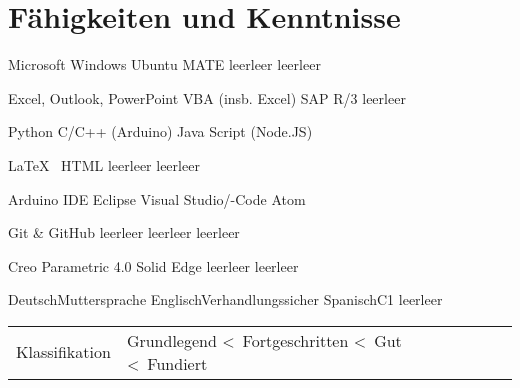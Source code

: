 \section*{Fähigkeiten und Kenntnisse}


%
	{Microsoft Windows}{\fundiert}%
	{Ubuntu MATE}{\fortgeschritten}%
	{leer}{leer}%
	{leer}{leer}%
	

%
	{Excel, Outlook, PowerPoint}{\fundiert}%
	{VBA (insb. Excel)}{\fundiert}%
	{SAP R/3}{\fortgeschritten}%
	{leer}{leer}%
	

	{Python}{\gut}
	{C/C++ (Arduino)}{\gut}
	{Java Script (Node.JS)}{\gut}
	{}{\fortgeschritten}
	

%
	{\LaTeX\ }{\gut}%
	{HTML}{\grundlegend}%
	{leer}{leer}%
	{leer}{leer}%


%
	{Arduino IDE}{\gut}%
	{Eclipse}{\fortgeschritten}%
	{Visual Studio/-Code}{\grundlegend}%
	{Atom}{\grundlegend}%
	

%
	{Git \& GitHub}{\grundlegend}%
	{leer}{leer}%
	{leer}{leer}%
	{leer}{leer}%


%
	{Creo Parametric 4.0}{\fundiert}%
	{Solid Edge}{\gut}%
	{leer}{leer}%
	{leer}{leer}%
	

%
	{Deutsch}{Muttersprache}%
	{Englisch}{Verhandlungssicher}%
	{Spanisch}{C1}%
	{leer}{leer}%
	



\noindent
\begin{tabular*}{\textwidth}{@{}R{\BrErsteSpSkills}|lll}
	\noindent
	{\small Klassifikation}	&	{\small Grundlegend \textless~Fortgeschritten \textless~Gut \textless~Fundiert}
\end{tabular*}

	
